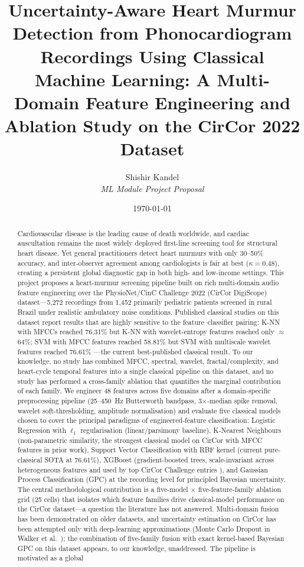 \documentclass[10pt,twocolumn]{article}
\title{\textbf{Uncertainty-Aware Heart Murmur Detection from Phonocardiogram Recordings Using Classical Machine Learning: A Multi-Domain Feature Engineering and Ablation Study on the CirCor 2022 Dataset}}
\author{Shishir Kandel \\
\textit{ML Module Project Proposal}}
\date{\today}
\begin{document}
\maketitle

\begin{abstract}
Cardiovascular disease is the leading cause of death worldwide, and cardiac auscultation remains the most widely deployed first-line screening tool for structural heart disease. Yet general practitioners detect heart murmurs with only 30--50\% accuracy, and inter-observer agreement among cardiologists is fair at best ($\kappa = 0.48$), creating a persistent global diagnostic gap in both high- and low-income settings. This project proposes a heart-murmur screening pipeline built on rich multi-domain audio feature engineering over the PhysioNet/CinC Challenge 2022 (CirCor DigiScope) dataset---5{,}272 recordings from 1{,}452 primarily pediatric patients screened in rural Brazil under realistic ambulatory noise conditions. Published classical studies on this dataset report results that are highly sensitive to the feature--classifier pairing: K-NN with MFCCs reached 76.31\% \citep{fuadah2023} but K-NN with wavelet-entropy features reached only $\approx$64\%; SVM with MFCC features reached 58.81\% \citep{fuadah2023} but SVM with multiscale wavelet features reached 76.61\% \citep{wavelet2025}---the current best-published classical result. To our knowledge, no study has combined MFCC, spectral, wavelet, fractal/complexity, and heart-cycle temporal features into a single classical pipeline on this dataset, and no study has performed a cross-family ablation that quantifies the marginal contribution of each family. We engineer 48 features across five domains after a domain-specific preprocessing pipeline (25--450~Hz Butterworth bandpass, 3$\times$-median spike removal, wavelet soft-thresholding, amplitude normalisation) and evaluate five classical models chosen to cover the principal paradigms of engineered-feature classification: Logistic Regression with $\ell_1$ regularisation (linear/parsimony baseline), K-Nearest Neighbours (non-parametric similarity, the strongest classical model on CirCor with MFCC features in prior work), Support Vector Classification with RBF kernel (current pure-classical SOTA at 76.61\%), XGBoost (gradient-boosted trees, scale-invariant across heterogeneous features and used by top CirCor Challenge entries \citep{rohr2024heart2beat, walker2022dbres}), and Gaussian Process Classification (GPC) at the recording level for principled Bayesian uncertainty. The central methodological contribution is a five-model $\times$ five-feature-family ablation grid (25 cells) that isolates which feature families drive classical-model performance on the CirCor dataset---a question the literature has not answered. Multi-domain fusion has been demonstrated on older datasets, and uncertainty estimation on CirCor has been attempted only with deep-learning approximations (Monte Carlo Dropout in Walker et al.\ \citep{walker2022dbres}); the combination of five-family fusion with exact kernel-based Bayesian GPC on this dataset appears, to our knowledge, unaddressed. The pipeline is motivated as a global 
\end{abstract}
\end{document}
